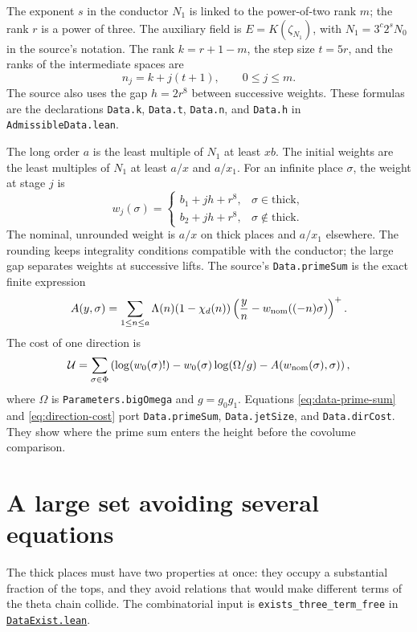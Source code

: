 \documentclass[11pt,oneside,openany]{amsbook}
\theoremstyle{remark}
\numberwithin{equation}{section}
\newcommand{\ghroot}{https://github.com/lsernau/grh-lean/blob/}
\newcommand{\ghrev}{72fead102f663d5c7a407964a13dc0cf9d977207}
\newcommand{\leanfile}[2]{%
  \href{\ghroot\ghrev/grh-compact/src/#1}{\nolinkurl{#2}}}
\begin{document}
The exponent $s$ in the conductor $N_1$ is linked to the
power-of-two rank $m$; the rank $r$ is a power of three.
The auxiliary field is $E=K(\zeta_{N_1})$, with
$N_1=3^c2^sN_0$ in the source's notation. The rank
$k=r+1-m$, the step size $t=5r$, and the ranks of the
intermediate spaces are
\begin{equation}
\label{eq:chain-ranks}
n_j=k+j(t+1),\qquad 0\le j\le m.
\end{equation}
The source also uses the gap $h=2r^8$ between successive
weights. These formulas are the declarations
\texttt{Data.k}, \texttt{Data.t}, \texttt{Data.n}, and
\texttt{Data.h} in \texttt{AdmissibleData.lean}.

The long order $a$ is the least multiple of $N_1$ at least
$xb$. The initial weights are the least multiples of $N_1$
at least $a/x$ and $a/x_1$. For an infinite place $\sigma$,
the weight at stage $j$ is
\begin{equation}
\label{eq:weight-stages}
w_j(\sigma)=
\begin{cases}
 b_1+jh+r^8,&\sigma\in\mathrm{thick},\\
 b_2+jh+r^8,&\sigma\notin\mathrm{thick}.
\end{cases}
\end{equation}
The nominal, unrounded weight is $a/x$ on thick places
and $a/x_1$ elsewhere. The rounding keeps integrality
conditions compatible with the conductor; the large gap
separates weights at successive lifts. The source's
\texttt{Data.primeSum} is the exact finite expression
\begin{equation}
\label{eq:data-prime-sum}
A(y,\sigma)=\sum_{1\le n\le a}
 \Lambda(n)(1-\chi_d(n))
 \left(\frac yn-
 w_{\rm nom}((-n)\sigma)\right)^+.
\end{equation}
The cost of one direction is
\begin{equation}
\label{eq:direction-cost}
\mathcal U=\sum_{\sigma\in\Phi}
\left(\log(w_0(\sigma)!)-
 w_0(\sigma)\log(\Omega/g)-
 A(w_{\rm nom}(\sigma),\sigma)\right),
\end{equation}
where $\Omega$ is \texttt{Parameters.bigOmega} and
$g=g_0g_1$. Equations \eqref{eq:data-prime-sum}
and \eqref{eq:direction-cost} port \texttt{Data.primeSum},
\texttt{Data.jetSize}, and \texttt{Data.dirCost}. They show
where the prime sum enters the height before the
covolume comparison.

\section{A large set avoiding several equations}
\label{sec:behrend}
The thick places must have two properties at once: they
occupy a substantial fraction of the tops, and they avoid
relations that would make different terms of the theta
chain collide. The combinatorial input is
\texttt{exists\_three\_term\_free} in
\leanfile{New/Data/DataExist.lean}{DataExist.lean}.
\end{document}
